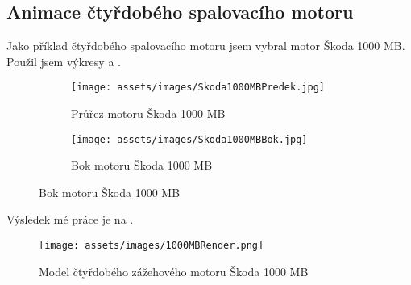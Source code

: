 \subsection{Animace čtyřdobého spalovacího motoru}
{Jako příklad čtyřdobého spalovacího motoru jsem vybral motor Škoda 1000 MB. Použil jsem výkresy  a .}
\begin{figure}[H]
    \begingroup
    \makeatletter
    \renewcommand\thesubfigure{\thefigure~--~\@nameuse{subfiglabel@\alph{subfigure}}}
    \newcommand{\subfiglabel@a}{vlevo}
    \newcommand{\subfiglabel@b}{vpravo}
    \captionsetup[subfigure]{labelformat=simple, labelsep=colon}
    \renewcommand\p@subfigure{}
    \makeatother
    \centering
    \begin{subfigure}{.5\textwidth}
        \centering
        \texttt{[image: assets/images/Skoda1000MBPredek.jpg]}
        \caption{Průřez motoru Škoda 1000 MB \cite{AUTOMOBIL:Skoda1000MBLegendaSlavi60Let}}
        \label{obr:1000MBvykresyPrurez}
    \end{subfigure}\hfill
    \begin{subfigure}{.48\textwidth}
        \centering
        \texttt{[image: assets/images/Skoda1000MBBok.jpg]}
        \caption{Bok motoru Škoda 1000 MB \cite{AUTOMOBIL:Skoda1000MBLegendaSlavi60Let}}
        \label{obr:1000MBvykresyBok}
    \end{subfigure}
    \endgroup
\end{figure}
{Výsledek mé práce je na .}
\begin{figure}[H]
    \centering
    \texttt{[image: assets/images/1000MBRender.png]}
    \caption{Model čtyřdobého zážehového motoru Škoda 1000 MB \jaObr}
    \label{obr:1000MBRender}
\end{figure}
\newpage
